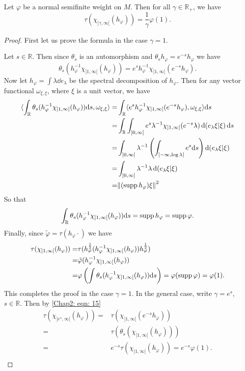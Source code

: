 \begin{lemma}\label{Chap2: Lemma: 5}
    Let $\varphi$ be a normal semifinite weight on $M$. Then for all $\gamma\in \mathbb{R}_+$, we have
    \[
        \tau(\chi_{]\gamma,\infty[}(h_\varphi))=\frac{1}{\gamma}\varphi(1).
    \]
\end{lemma}
\begin{proof}
    First let us prove the formula in the case $\gamma=1$.\par
    Let $s\in \mathbb{R}$. Then since $\theta_s$ is an automorphism and $\theta_sh_\varphi=e^{-s}h_\varphi$ we have
    \[
        \theta_s(h_\varphi^{-1}\chi_{]1,\infty[}(h_\varphi))=e^sh_\varphi^{-1}\chi_{]1,\infty[}(e^{-s}h_\varphi).
    \]
    Now let $h_\varphi=\int\lambda\dd e_\lambda$ be the spectral decomposition of $h_\varphi$. Then for any vector functional $\omega_{\xi,\xi}$, where $\xi$ is a unit vector, we have
    \[
        \begin{split}
            \langle\int_\mathbb{R}\theta_s(h_\varphi^{-1}\chi_{]1,\infty[}(h_\varphi))\dd s,\omega_{\xi,\xi}\rangle=&\int_\mathbb{R}\langle e^sh_\varphi^{-1}\chi_{]1,\infty[}(e^{-s}h_\varphi),\omega_{\xi,\xi}\rangle\dd s\\
            =&\int_\mathbb{R}\int_{]0,\infty[}e^s\lambda^{-1}\chi_{]1,\infty[}(e^{-s}\lambda)\dd (e_\lambda \xi|\xi)\dd s\\
            =&\int_{]0,\infty[}\lambda^{-1}\left( \int_{]-\infty,\log \lambda[}e^s\dd s \right)\dd (e_\lambda \xi|\xi)\\
            =&\int_{]0,\infty[}\lambda^{-1}\lambda\dd (e_\lambda \xi|\xi)\\
            =&\norm{(\operatorname{supp} h_\varphi)\xi}^2
        \end{split}
    \]
    So that
    \[
        \int_\mathbb{R}\theta_s(h_\varphi^{-1}\chi_{]1,\infty[}(h_\varphi))\dd s=\operatorname{supp} h_\varphi=\operatorname{supp} \varphi.
    \]
    Finally, since $\tilde{\varphi}=\tau(h_\varphi\cdot)$ we have
    \[
        \begin{split}
            \tau(\chi_{]1,\infty[}(h_\varphi))=&\tau(h_\varphi^\frac{1}{2}(h_\varphi^{-1}\chi_{]1,\infty[}(h_\varphi))h_\varphi^\frac{1}{2})\\
            =&\tilde{\varphi}(h_\varphi^{-1}\chi_{]1,\infty[}(h_\varphi))\\
            =&\varphi\left( \int \theta_s(h_\varphi^{-1}\chi_{]1,\infty[}(h_\varphi))\dd s \right)=\varphi(\operatorname{supp} \varphi)=\varphi(1).
        \end{split}
    \]
    This completes the proof in the case $\gamma=1$. In the general case, write $\gamma=e^s$, $s\in \mathbb{R}$. Then by \eqref{Chap2: eqn: 15}
    \[
        \begin{split}
            \tau(\chi_{]e^s,\infty[}(h_\varphi))=&\tau(\chi_{]1,\infty[}(e^{-s}h_\varphi))\\
            =&\tau(\theta_s(\chi_{]1,\infty[}(h_\varphi)))\\
            =&e^{-s}\tau(\chi_{]1,\infty[}(h_\varphi))=e^{-s}\varphi(1).\\
        \end{split}
    \]
\end{proof}
